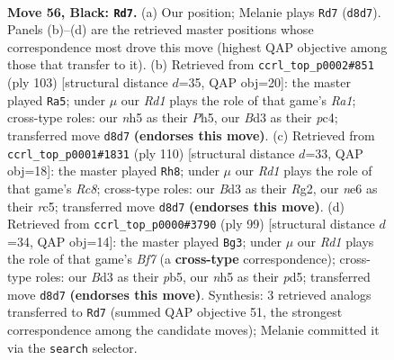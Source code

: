 \documentclass[11pt]{article}
\begin{document}
\clearpage

\begin{figure}[p]\centering
\begin{subfigure}{0.46\textwidth}\centering
\resizebox{\linewidth}{!}{%
\newchessgame
\chessboard[
  setfen={3r4/k7/4N3/2RB1p1N/1P6/1K1b4/6P1/8 b - - 9 56},
  showmover=false,
  pgfstyle=straightmove, color=movearrow, markmove={d8-d7}
]}
\caption{}
\end{subfigure}\hfill
\begin{subfigure}{0.46\textwidth}\centering
\resizebox{\linewidth}{!}{%
\newchessgame
\chessboard[
  setfen={r7/1pN2k2/8/7p/2P5/pB4B1/K4Pb1/8 b - - 9 52},
  showmover=false,
  pgfstyle=straightmove, color=movearrow, markmove={a8-a5}
]}
\caption{}
\end{subfigure}
\\[4pt]
\begin{subfigure}{0.46\textwidth}\centering
\resizebox{\linewidth}{!}{%
\newchessgame
\chessboard[
  setfen={B1R5/p7/1b6/2r2n2/K7/4k3/6R1/8 w - - 13 56},
  showmover=false,
  pgfstyle=straightmove, color=movearrow, markmove={c8-h8}
]}
\caption{}
\end{subfigure}\hfill
\begin{subfigure}{0.46\textwidth}\centering
\resizebox{\linewidth}{!}{%
\newchessgame
\chessboard[
  setfen={8/6k1/K2p4/1P1P4/2B4p/3N4/1P3bb1/8 b - - 1 50},
  showmover=false,
  pgfstyle=straightmove, color=movearrow, markmove={f2-g3}
]}
\caption{}
\end{subfigure}
\caption{\textbf{Move 56, Black: \texttt{Rd7}.} (a) Our position; Melanie plays \texttt{Rd7} (\texttt{d8d7}). Panels (b)--(d) are the retrieved master positions whose correspondence most drove this move (highest QAP objective among those that transfer to it). (b) Retrieved from \texttt{ccrl\_top\_p0002\#851} (ply 103) [structural distance $d$=35, QAP obj=20]: the master played \texttt{Ra5}; under $\mu$ our \emph{Rd1} plays the role of that game's \emph{Ra1}; cross-type roles: our \emph{n}h5 as their \emph{P}h5, our \emph{B}d3 as their \emph{p}c4; transferred move \texttt{d8d7} \textbf{(endorses this move)}. (c) Retrieved from \texttt{ccrl\_top\_p0001\#1831} (ply 110) [structural distance $d$=33, QAP obj=18]: the master played \texttt{Rh8}; under $\mu$ our \emph{Rd1} plays the role of that game's \emph{Rc8}; cross-type roles: our \emph{B}d3 as their \emph{R}g2, our \emph{n}e6 as their \emph{r}c5; transferred move \texttt{d8d7} \textbf{(endorses this move)}. (d) Retrieved from \texttt{ccrl\_top\_p0000\#3790} (ply 99) [structural distance $d$=34, QAP obj=14]: the master played \texttt{Bg3}; under $\mu$ our \emph{Rd1} plays the role of that game's \emph{Bf7} (a \textbf{cross-type} correspondence); cross-type roles: our \emph{B}d3 as their \emph{p}b5, our \emph{n}h5 as their \emph{p}d5; transferred move \texttt{d8d7} \textbf{(endorses this move)}. Synthesis: 3 retrieved analogs transferred to \texttt{Rd7} (summed QAP objective 51, the strongest correspondence among the candidate moves); Melanie committed it via the \texttt{search} selector.}
\label{fig:thought-m111}
\end{figure}
\end{document}
